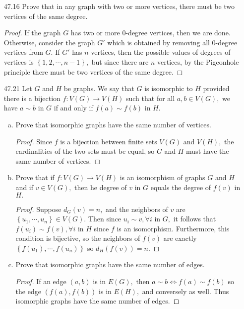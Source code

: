 \documentclass{article}
\begin{document}
\begin{itemize}
\begin{enumerate}[(a)]
		\end{enumerate}
	\item[47.16] Prove that in any graph with two or more vertices, there must be two vertices of the same degree.
		\begin{proof}
			If the graph $G$ has two or more 0-degree vertices, then we are done. Otherwise, consider the graph $G'$ which is obtained by removing all 0-degree vertices from $G.$ If $G'$ has $n$ vertices, then the possible values of degrees of vertices is $\left\{ 1, 2, \cdots, n-1 \right\},$ but since there are $n$ vertices, by the Pigeonhole principle there must be two vertices of the same degree.
		\end{proof}

	\item[47.21] Let $G$ and $H$ be graphs. We say that $G$ is isomorphic to $H$ provided there is a bijection $f:V(G)\to V(H)$ such that for all $a, b\in V(G),$ we have $a\sim b$ in $G$ if and only if $f(a)\sim f(b)$ in $H.$ 
		\begin{enumerate}[(a)]
			\item Prove that isomorphic graphs have the same number of vertices.
				\begin{proof}
					Since $f$ is a bijection between finite sets $V(G)$ and $V(H),$ the cardinalities of the two sets must be equal, so $G$ and $H$ must have the same number of vertices.
				\end{proof}

			\item Prove that if $f:V(G)\to V(H)$ is an isomorphism of graphs $G$ and $H$ and if $v\in V(G),$ then he degree of $v$ in $G$ equals the degree of $f(v)$ in $H.$
				\begin{proof}
					Suppose $d_G(v)=n,$ and the neighbors of $v$ are $\left\{ u_1, \cdots, u_n \right\}\in V(G).$ Then since $u_i\sim v, \forall i$ in $G,$ it follows that $f(u_i)\sim f(v), \forall i$ in $H$ since $f$ is an isomorphism. Furthermore, this condition is bijective, so the neighbors of $f(v)$ are exactly $\left\{ f(u_1), \cdots, f(u_n) \right\}$ so $d_H(f(v))=n.$
				\end{proof}

			\item Prove that isomorphic graphs have the same number of edges.
				\begin{proof}
					If an edge $(a, b)$ is in $E(G),$ then $a\sim b\iff f(a)\sim f(b)$ so the edge $(f(a), f(b))$ is in $E(H),$ and conversely as well. Thus isomorphic graphs have the same number of edges.
				\end{proof}


\end{enumerate}
\end{itemize}
\end{document}
